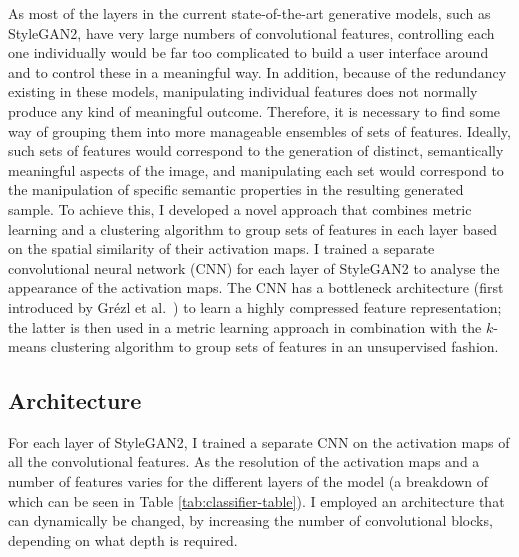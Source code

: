 As most of the layers in the current state-of-the-art generative models, such as StyleGAN2, have very large numbers of convolutional features, controlling each one individually would be far too complicated to build a user interface around and to control these in a meaningful way. 
In addition, because of the redundancy existing in these models, manipulating individual features does not normally produce any kind of meaningful outcome. 
Therefore, it is necessary to find some way of grouping them into more manageable ensembles of sets of features. 
Ideally, such sets of features would correspond to the generation of distinct, semantically meaningful aspects of the image, and manipulating each set would correspond to the manipulation of specific semantic properties in the resulting generated sample. 
To achieve this, I developed a novel approach that combines metric learning and a clustering algorithm to group sets of features in each layer based on the spatial similarity of their activation maps. 
I trained a separate convolutional neural network (CNN) for each layer of StyleGAN2 to analyse the appearance of the activation maps. 
The CNN has a bottleneck architecture (first introduced by Gr{\'e}zl et al.~\citep{grezl2007probabilistic}) to learn a highly compressed feature representation; the latter is then used in a metric learning approach in combination with the $k$-means clustering algorithm \citep{lloyd1982least, celebi2013comparative} to group sets of features in an unsupervised fashion. 

\subsection{Architecture}

For each layer of StyleGAN2, I trained a separate CNN on the activation maps of all the convolutional features. 
As the resolution of the activation maps and a number of features varies for the different layers of the model (a breakdown of which can be seen in Table \ref{tab:classifier-table}).
I employed an architecture that can dynamically be changed, by increasing the number of convolutional blocks, depending on what depth is required. 

